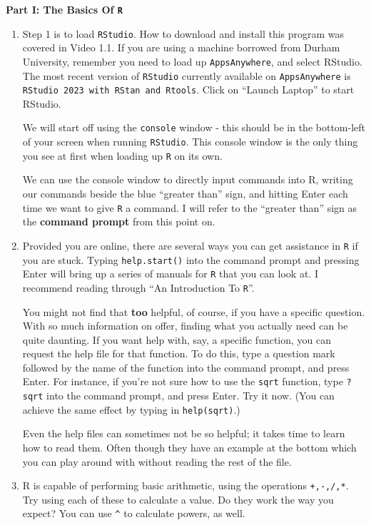 \documentclass[11pt,a4paper]{article}
\begin{document}
\textbf{Part I: The Basics Of \texttt{R}}
\begin{enumerate} 
\item Step 1 is to load \texttt{RStudio}. How to download and install this program was covered in Video 1.1. If you are using a machine borrowed from Durham University, remember you need to load up \texttt{AppsAnywhere}, and select RStudio. The most recent version of \texttt{RStudio} currently available on \texttt{AppsAnywhere} is \texttt{RStudio 2023 with RStan and Rtools}. Click on ``Launch Laptop'' to start RStudio.

We will start off using the \texttt{console} window - this should be in the bottom-left of your screen when running \texttt{RStudio}. This console window is the only thing you see at first when loading up \texttt{R} on its own.

We can use the console window to directly input commands into R, writing our commands beside the blue ``greater than'' sign, and hitting Enter each time we want to give \texttt{R} a command. I will refer to the ``greater than'' sign as the \textbf{command prompt} from this point on.

\item Provided you are online, there are several ways you can get assistance in \texttt{R} if you are stuck. Typing \texttt{help.start()} into the command prompt and pressing Enter will bring up a series of manuals for \texttt{R} that you can look at. I recommend reading through ``An Introduction To \texttt{R}''.

You might not find that \textbf{too} helpful, of course, if you have a specific question. With so much information on offer, finding what you actually need can be quite daunting. If you want help with, say, a specific function, you can request the help file for that function. To do this, type a question mark followed by the name of the function into the command prompt, and press Enter. For instance, if you're not sure how to use the \texttt{sqrt} function, type \texttt{?sqrt} into the command prompt, and press Enter. Try it now. (You can achieve the same effect by typing in \texttt{help(sqrt)}.)

Even the help files can sometimes not be so helpful; it takes time to learn how to read them. Often though they have an example at the bottom which you can play around with without reading the rest of the file.

\item R is capable of performing basic arithmetic, using the operations \texttt{+,-,/,*}. Try using each of these to calculate a value. Do they work the way you expect? You can use \texttt{\^} to calculate powers, as well.


\end{enumerate}
\end{document}
